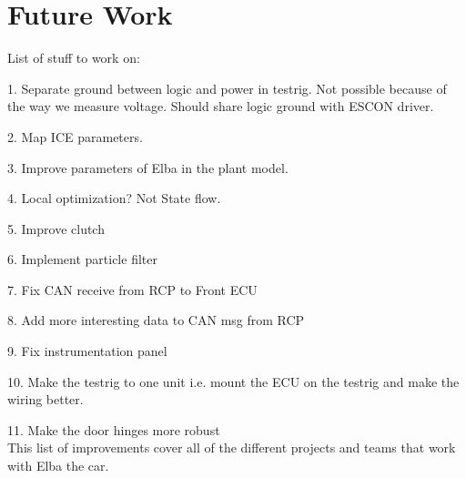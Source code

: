 \chapter{Future Work}

List of stuff to work on:

1. Separate ground between logic and power in testrig. Not possible because of the way we measure voltage. Should share logic ground with ESCON driver.

2. Map ICE parameters.

3. Improve parameters of Elba in the plant model.

4. Local optimization? Not State flow.

5. Improve clutch

6. Implement particle filter

7. Fix CAN receive from RCP to Front ECU

8. Add more interesting data to CAN msg from RCP

9. Fix instrumentation panel

10. Make the testrig to one unit i.e. mount the ECU on the testrig and make the wiring better.

11. Make the door hinges more robust\\

This list of improvements cover all of the different projects and teams that work with Elba the car. 